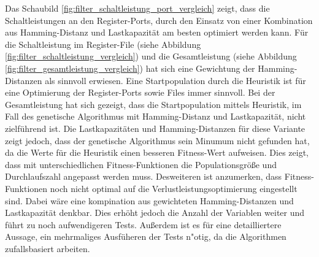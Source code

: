 Das Schaubild \ref{fig:filter_schaltleistung_port_vergleich} zeigt, dass die Schaltleistungen an den Register-Ports, durch den Einsatz von einer Kombination aus Hamming-Distanz und Lastkapazit\"at am besten optimiert werden kann. F\"ur die Schaltleistung im Register-File (siehe Abbildung \ref{fig:filter_schaltleistung_vergleich}) und die Gesamtleistung (siehe Abbildung \ref{fig:filter_gesamtleistung_vergleich}) hat sich eine Gewichtung der Hamming-Distanzen als sinnvoll erwiesen. Eine Startpopulation durch die Heuristik ist f\"ur eine Optimierung der Register-Ports sowie Files immer sinnvoll. Bei der Gesamtleistung hat sich gezeigt, dass die Startpopulation mittels Heuristik, im Fall des genetische Algorithmus mit Hamming-Distanz und Lastkapazit\"at, nicht zielf\"uhrend ist. Die Lastkapazit\"aten und Hamming-Distanzen f\"ur diese Variante zeigt jedoch, dass der genetische Algorithmus sein Minumum nicht gefunden hat, da die Werte f\"ur die Heuristik einen besseren Fitness-Wert aufweisen. Dies zeigt, dass mit unterschiedlichen Fitness-Funktionen die Populationsgr\"o\ss{}e und Durchlaufszahl angepasst werden muss. Desweiteren ist anzumerken, dass Fitness-Funktionen noch nicht optimal auf die Verlustleistungsoptimierung eingestellt sind. Dabei w\"are eine kompination aus gewichteten Hamming-Distanzen und Lastkapazit\"at denkbar. Dies erh\"oht jedoch die Anzahl der Variablen weiter und f\"uhrt zu noch aufwendigeren Tests. Au\ss{}erdem ist es f\"ur eine detailliertere Aussage, ein mehrmaliges Ausf\"uheren der Tests n"otig, da die Algorithmen zufallsbasiert arbeiten. 




 


